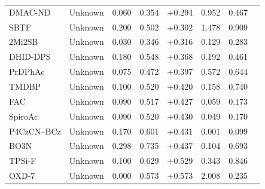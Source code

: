 \begin{longtable}{llcccccc}
DMAC-ND & Unknown & 0.060 & 0.354 & +0.294 & 0.952 & 0.467 & \cite{doi101039C9TC00503J} \\
SBTF & Unknown & 0.200 & 0.502 & +0.302 & 1.478 & 0.909 & \cite{doi101016jdyepig201504020} \\
2Mi2SB & Unknown & 0.030 & 0.346 & +0.316 & 0.129 & 0.283 & \cite{doi101039D1TC05196B} \\
DHID-DPS & Unknown & 0.180 & 0.548 & +0.368 & 0.192 & 0.461 & \cite{doi101016jjlumin2021118287} \\
PrDPhAc & Unknown & 0.075 & 0.472 & +0.397 & 0.572 & 0.644 & \cite{doi101039C6CC02856J} \\
TMDBP & Unknown & 0.100 & 0.520 & +0.420 & 0.158 & 0.740 & \cite{doi101039C9CC09769D} \\
FAC & Unknown & 0.090 & 0.517 & +0.427 & 0.059 & 0.173 & \cite{doi101039D2TC00344A} \\
SpiroAc & Unknown & 0.090 & 0.520 & +0.430 & 0.049 & 0.170 & \cite{doi101039D2TC00344A} \\
P4CzCN--BCz & Unknown & 0.170 & 0.601 & +0.431 & 0.001 & 0.099 & \cite{doi101039D1TC05010A} \\
BO3N & Unknown & 0.298 & 0.735 & +0.437 & 0.104 & 0.693 & \cite{doi101016jcej2021133030} \\
TPSi-F & Unknown & 0.100 & 0.629 & +0.529 & 0.343 & 0.846 & \cite{doi101016jorgel201405027} \\
OXD-7 & Unknown & 0.000 & 0.573 & +0.573 & 2.008 & 0.235 & \cite{doi101016jmolstruc201906003} \\
\end{longtable}
